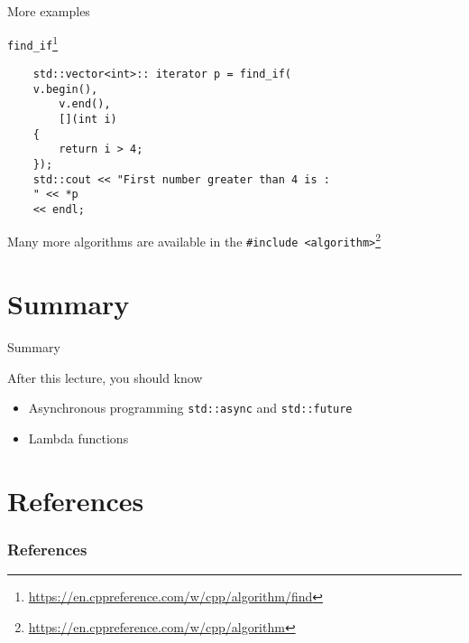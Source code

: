 \documentclass[\classoption]{beamer}
\begin{document}
\begin{frame}[fragile]{More examples}

\begin{block}{\lstinline|find_if|\footnote{\tiny\url{https://en.cppreference.com/w/cpp/algorithm/find}}}
\begin{lstlisting}
    std::vector<int>:: iterator p = find_if(
    v.begin(), 
    	v.end(), 
    	[](int i) 
    { 
        return i > 4; 
    }); 
    std::cout << "First number greater than 4 is : 
    " << *p 
    << endl;
\end{lstlisting}
\end{block}
Many more algorithms are available in the \lstinline|#include <algorithm>|\footnote{\tiny\url{https://en.cppreference.com/w/cpp/algorithm}}
\end{frame}
     


\section{Summary}
\begin{frame}{Summary}
\begin{block}{After this lecture, you should know}
\begin{itemize}
\item Asynchronous programming \lstinline|std::async| and \lstinline|std::future|
\item Lambda functions
\end{itemize}
\end{block}
\end{frame}


\section{References}

\begin{frame}[t, allowframebreaks]
\frametitle{References}


\end{frame}
\end{document}
